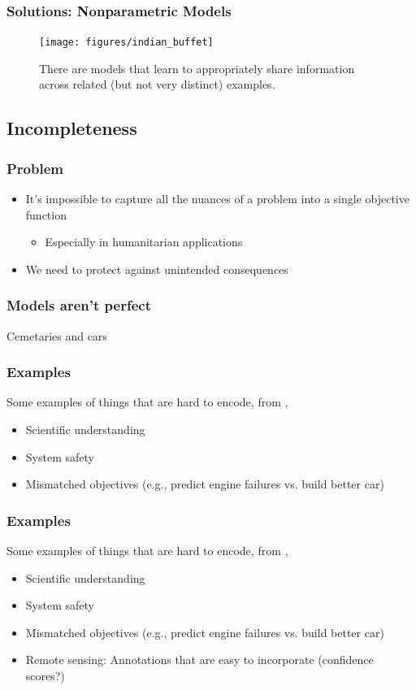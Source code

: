 \documentclass[10pt,mathserif]{beamer}
\begin{document}
\begin{frame}[]
  \frametitle{Solutions: Nonparametric Models}
  \begin{figure}[ht]
    \centering
    \texttt{[image: figures/indian\_buffet]}
    \caption{There are models that learn to appropriately share information
      across related (but not very distinct) examples. \label{fig:label} }
\end{figure}
\end{frame}

\subsection{Incompleteness}
\label{subsec:label}

\begin{frame}
  \frametitle{Problem}
  \begin{itemize}
  \item It's impossible to capture all the nuances of a problem into a single
    objective function
    \begin{itemize}
    \item Especially in humanitarian applications
    \end{itemize}
  \item We need to protect against unintended consequences
  \end{itemize}
\end{frame}

\begin{frame}
  \frametitle{Models aren't perfect}
 Cemetaries and cars 
\end{frame}

\begin{frame}
  \frametitle{Examples}
  Some examples of things that are hard to encode, from
  \citep{doshi2017towards},
  \begin{itemize}
  \item Scientific understanding
  \item System safety
  \item Mismatched objectives (e.g., predict engine failures vs. build better
    car)
  \end{itemize}
\end{frame}

\begin{frame}
  \frametitle{Examples}
  Some examples of things that are hard to encode, from
  \citep{doshi2017towards},
  \begin{itemize}
  \item Scientific understanding
  \item System safety
  \item Mismatched objectives (e.g., predict engine failures vs. build better
    car)
  \item Remote sensing: Annotations that are easy to incorporate (confidence
    scores?)
  \end{itemize}
\end{frame}
\end{document}
